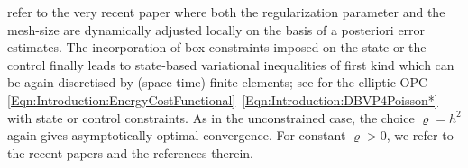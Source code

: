 \documentclass{article}
\numberwithin{equation}{section}
\begin{document}
refer to the very recent paper \cite{PowerPryer2025arXiv2503.11386} 
where  both the regularization parameter and the mesh-size are dynamically
adjusted locally on the basis of a posteriori error estimates.
The incorporation of box constraints imposed on the state or the control
finally leads to state-based variational inequalities of first kind which
can be again discretised by (space-time) finite elements; see
\cite{GanglLoescherSteinbach2025CAMWA} for the elliptic OPC
\eqref{Eqn:Introduction:EnergyCostFunctional}--\eqref{Eqn:Introduction:DBVP4Poisson*} with state or control constraints. As in the unconstrained case, 
the choice $\varrho = h^2$ again gives asymptotically optimal convergence.
For constant $\varrho > 0$, we refer to the recent papers
\cite{BrennerGedickeSung:2023CMAM,GongTan2025JSC,GudiShakya2025JCAM}
and the references therein.
\end{document}
